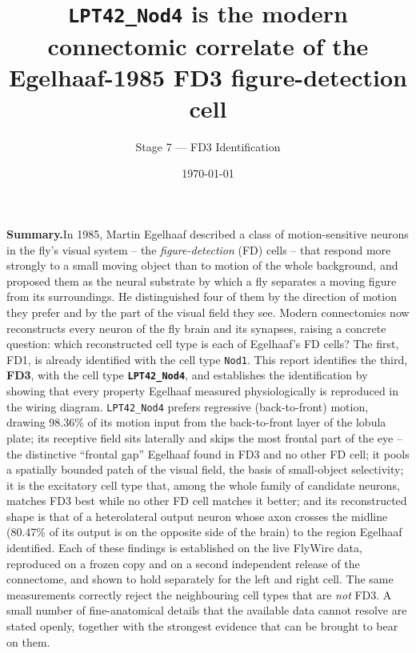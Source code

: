 \documentclass[11pt]{article}
\newcommand{\ttt}[1]{\texttt{#1}}
\begin{document}
\title{\textbf{\ttt{LPT42\_Nod4} is the modern connectomic correlate of the Egelhaaf-1985 FD3 figure-detection cell}}

\author{Stage 7 --- FD3 Identification}

\date{\today}

\maketitle

\textbf{Summary.}\quad In 1985, Martin Egelhaaf described a class of motion-sensitive neurons in the fly's visual system -- the \emph{figure-detection} (FD) cells -- that respond more strongly to a small moving object than to motion of the whole background, and proposed them as the neural substrate by which a fly separates a moving figure from its surroundings. He distinguished four of them by the direction of motion they prefer and by the part of the visual field they see. Modern connectomics now reconstructs every neuron of the fly brain and its synapses, raising a concrete question: which reconstructed cell type is each of Egelhaaf's FD cells? The first, FD1, is already identified with the cell type \ttt{Nod1}. This report identifies the third, \textbf{FD3}, with the cell type \textbf{\ttt{LPT42\_Nod4}}, and establishes the identification by showing that every property Egelhaaf measured physiologically is reproduced in the wiring diagram. \ttt{LPT42\_Nod4} prefers regressive (back-to-front) motion, drawing 98.36\% of its motion input from the back-to-front layer of the lobula plate; its receptive field sits laterally and skips the most frontal part of the eye -- the distinctive ``frontal gap'' Egelhaaf found in FD3 and no other FD cell; it pools a spatially bounded patch of the visual field, the basis of small-object selectivity; it is the excitatory cell type that, among the whole family of candidate neurons, matches FD3 best while no other FD cell matches it better; and its reconstructed shape is that of a heterolateral output neuron whose axon crosses the midline (80.47\% of its output is on the opposite side of the brain) to the region Egelhaaf identified. Each of these findings is established on the live FlyWire data, reproduced on a frozen copy and on a second independent release of the connectome, and shown to hold separately for the left and right cell. The same measurements correctly reject the neighbouring cell types that are \emph{not} FD3. A small number of fine-anatomical details that the available data cannot resolve are stated openly, together with the strongest evidence that can be brought to bear on them.
\end{document}
